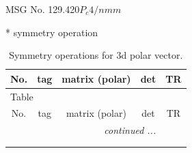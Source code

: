 \documentclass[fleqn,8pt]{jsarticle}
\begin{document}
\setcounter{MaxMatrixCols}{32}

\renewcommand{\tablename}{Table~}
\renewcommand{\figurename}{Figure~}
\begin{center}
\LARGE
MSG No. 129.420\quad$P_{c}4/nmm$
\end{center}
* symmetry operation
\renewcommand{\arraystretch}{1.3}
\begin{longtable}{ccccc}
\caption{Symmetry operations for 3d polar vector.}
 \\
 \hline \hline
No. & tag & matrix (polar) & det & TR \\ \hline \endfirsthead

\multicolumn{4}{l}{\tablename\ \thetable{}} \\
 \hline \hline
No. & tag & matrix (polar) & det & TR \\ \hline \endhead

 \hline \hline
\multicolumn{4}{r}{\footnotesize\it continued ...} \\ \endfoot

 \hline \hline
\multicolumn{4}{r}{} \\ \endlastfoot


\end{longtable}
\end{document}
